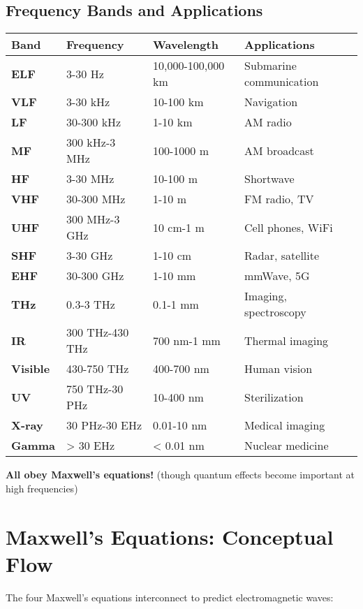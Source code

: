 \subsection{Frequency Bands and Applications}

{\def\LTcaptype{} %
\begin{longtable}[]{@{}llll@{}}
\toprule\noalign{}
Band & Frequency & Wavelength & Applications \\
\midrule\noalign{}
\endhead
\bottomrule\noalign{}
\endlastfoot
\textbf{ELF} & 3-30 Hz & 10,000-100,000 km & Submarine communication \\
\textbf{VLF} & 3-30 kHz & 10-100 km & Navigation \\
\textbf{LF} & 30-300 kHz & 1-10 km & AM radio \\
\textbf{MF} & 300 kHz-3 MHz & 100-1000 m & AM broadcast \\
\textbf{HF} & 3-30 MHz & 10-100 m & Shortwave \\
\textbf{VHF} & 30-300 MHz & 1-10 m & FM radio, TV \\
\textbf{UHF} & 300 MHz-3 GHz & 10 cm-1 m & Cell phones, WiFi \\
\textbf{SHF} & 3-30 GHz & 1-10 cm & Radar, satellite \\
\textbf{EHF} & 30-300 GHz & 1-10 mm & mmWave, 5G \\
\textbf{THz} & 0.3-3 THz & 0.1-1 mm & Imaging, spectroscopy \\
\textbf{IR} & 300 THz-430 THz & 700 nm-1 mm & Thermal imaging \\
\textbf{Visible} & 430-750 THz & 400-700 nm & Human vision \\
\textbf{UV} & 750 THz-30 PHz & 10-400 nm & Sterilization \\
\textbf{X-ray} & 30 PHz-30 EHz & 0.01-10 nm & Medical imaging \\
\textbf{Gamma} & \textgreater{} 30 EHz & \textless{} 0.01 nm & Nuclear
medicine \\
\end{longtable}
}

\textbf{All obey Maxwell's equations!} (though quantum effects become important at high frequencies)

\section{Maxwell's Equations: Conceptual Flow}

The four Maxwell's equations interconnect to predict electromagnetic waves:

